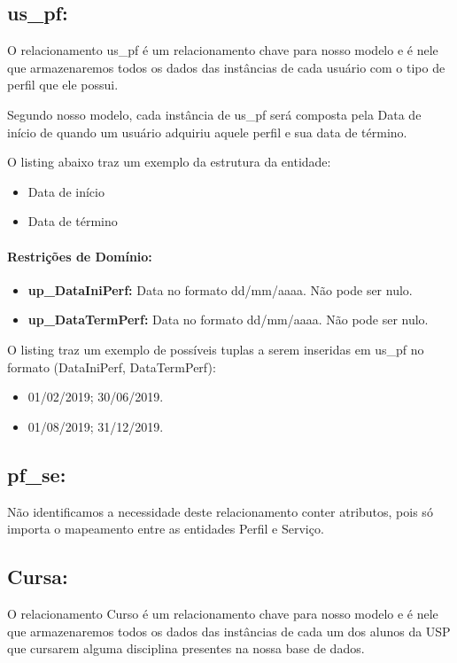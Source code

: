 \documentclass{report}
\begin{document}
\subsection{us\_pf:}
O relacionamento us\_pf é um relacionamento chave para nosso modelo e é nele que armazenaremos todos os dados das instâncias de cada usuário com o tipo de perfil que ele possui.
  
  Segundo nosso modelo, cada instância de us\_pf será composta pela Data de início de quando um usuário adquiriu aquele perfil e sua data de término. 
  
  O listing abaixo traz um exemplo da estrutura da entidade:
\begin{itemize}
  \item Data de início
  \item Data de término
\end{itemize}
\paragraph{Restrições de Domínio:}
\begin{itemize}
  \item \textbf{up\_DataIniPerf:} Data no formato dd/mm/aaaa. Não pode ser nulo.
  \item \textbf{up\_DataTermPerf:} Data no formato dd/mm/aaaa. Não pode ser nulo.
\end{itemize}
O listing traz um exemplo de possíveis tuplas a serem inseridas em us\_pf no formato (DataIniPerf, DataTermPerf):

\begin{itemize}
  \item 01/02/2019; 30/06/2019.
  \item 01/08/2019; 31/12/2019.
\end{itemize}
 \subsection{pf\_se:}
Não identificamos a necessidade deste relacionamento conter atributos, pois só
 importa o mapeamento entre as entidades Perfil e Serviço.
\subsection{Cursa:}
O relacionamento Curso é um relacionamento chave para nosso modelo e é nele que armazenaremos todos os dados das instâncias de cada um dos alunos da USP que cursarem alguma disciplina presentes na nossa base de dados.
  
\end{document}
